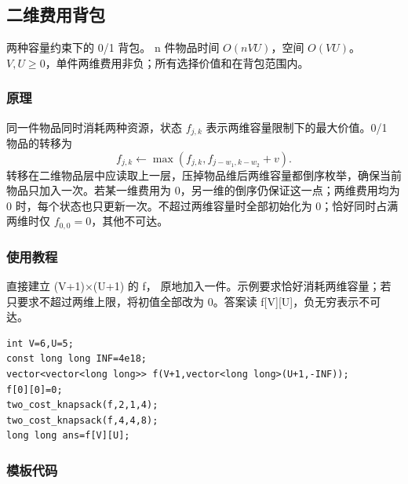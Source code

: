 \subsection{二维费用背包}
\label{dp:two-cost-knapsack}
\AlgorithmInfo
    {两种容量约束下的 0/1 背包。}
    {n 件物品时间 $O(nVU)$，空间 $O(VU)$。}
    {$V,U\ge0$，单件两维费用非负；所有选择价值和在背包范围内。}
\subsubsection*{原理}

同一件物品同时消耗两种资源，状态 $f_{j,k}$ 表示两维容量限制下的最大价值。0/1 物品的转移为
\[
 f_{j,k}\gets\max(f_{j,k},f_{j-w_1,k-w_2}+v).
\]
转移在二维物品层中应读取上一层，压掉物品维后两维容量都倒序枚举，确保当前物品只加入一次。若某一维费用为 0，另一维的倒序仍保证这一点；两维费用均为 0 时，每个状态也只更新一次。不超过两维容量时全部初始化为 0；恰好同时占满两维时仅 $f_{0,0}=0$，其他不可达。

\subsubsection*{使用教程}
直接建立 (V+1)×(U+1) 的 f， 原地加入一件。示例要求恰好消耗两维容量；若只要求不超过两维上限，将初值全部改为 0。答案读 f[V][U]，负无穷表示不可达。
\begin{lstlisting}[style=mtycpp,numbers=none]
int V=6,U=5;
const long long INF=4e18;
vector<vector<long long>> f(V+1,vector<long long>(U+1,-INF));
f[0][0]=0;
two_cost_knapsack(f,2,1,4);
two_cost_knapsack(f,4,4,8);
long long ans=f[V][U];
\end{lstlisting}
\subsubsection*{模板代码}
